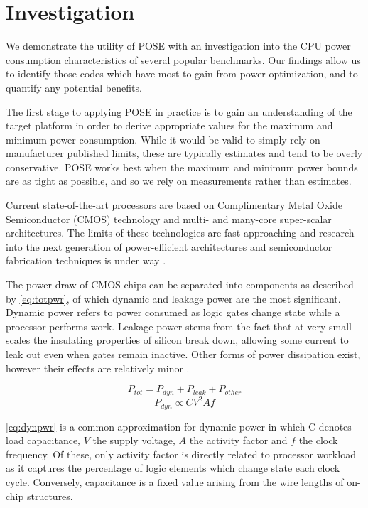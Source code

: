 \section{Investigation}
\label{sec:investigation}


We demonstrate the utility of POSE with an investigation into the CPU power consumption characteristics of several popular benchmarks.
Our findings allow us to identify those codes which have most to gain from power optimization, and to quantify any potential benefits.

The first stage to applying POSE in practice is to gain an understanding of the target platform in order to derive appropriate values for the maximum and minimum power consumption.
While it would be valid to simply rely on manufacturer published limits, these are typically estimates and tend to be overly conservative.
POSE works best when the maximum and minimum power bounds are as tight as possible, and so we rely on measurements rather than estimates.

Current state-of-the-art processors are based on Complimentary Metal Oxide Semiconductor (CMOS) technology and multi- and many-core super-scalar architectures.
The limits of these technologies are fast approaching and research into the next generation of power-efficient architectures and semiconductor fabrication techniques is under way \cite{esmaeilzadeh:2011aa}.

The power draw of CMOS chips can be separated into components as described by \autoref{eq:totpwr}, of which dynamic and leakage power are the most significant.
Dynamic power refers to power consumed as logic gates change state while a processor performs work. 
Leakage power stems from the fact that at very small scales the insulating properties of silicon break down, allowing some current to leak out even when gates remain inactive.
Other forms of power dissipation exist, however their effects are relatively minor \cite{kaxiras:2008aa}.


\begin{equation}
\label{eq:totpwr}
P_{tot} = P_{dyn} + P_{leak} + P_{other}
\end{equation}
\begin{equation} 
\label{eq:dynpwr}
P_{dyn} \propto CV^{2}Af
\end{equation}

\autoref{eq:dynpwr} is a common approximation for dynamic power in which C denotes load capacitance, $V$ the supply voltage, $A$ the activity factor and $f$ the clock frequency.
Of these, only activity factor is directly related to processor workload as it captures the percentage of logic elements which change state each clock cycle.
Conversely, capacitance is a fixed value arising from the wire lengths of on-chip structures.


